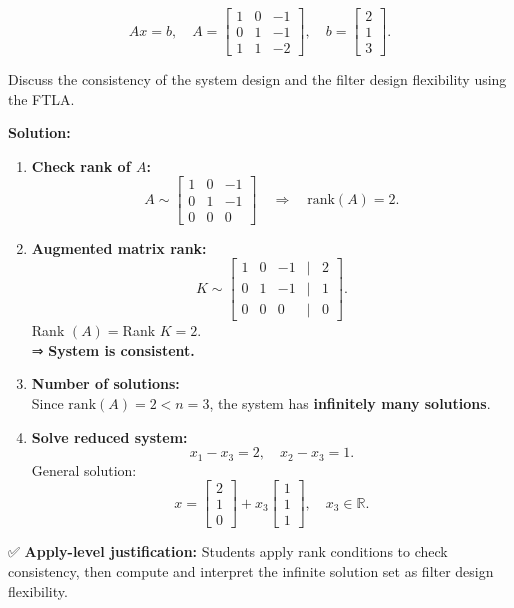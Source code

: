 \documentclass[
  letterpaper,
  DIV=11,
  numbers=noendperiod]{scrreprt}
\begin{document}
\[
Ax = b, \quad 
A = \begin{bmatrix}
1 & 0 & -1 \\
0 & 1 & -1 \\
1 & 1 & -2
\end{bmatrix}, \quad 
b = \begin{bmatrix} 2 \\ 1 \\ 3 \end{bmatrix}.
\]

Discuss the consistency of the system design and the filter design
flexibility using the FTLA.

\textbf{Solution:}

\begin{enumerate}
\def\labelenumi{\arabic{enumi}.}
\item
  \textbf{Check rank of \(A\):} \[
  A \sim 
  \begin{bmatrix}
  1 & 0 & -1 \\
  0 & 1 & -1 \\
  0 & 0 & 0
  \end{bmatrix}
  \quad \Rightarrow \quad \text{rank}(A)=2.
  \]
\item
  \textbf{Augmented matrix rank:} \[
  K \sim 
  \begin{bmatrix}
  1 & 0 & -1 & | & 2 \\
  0 & 1 & -1 & | & 1 \\
  0 & 0 & 0 & | & 0
  \end{bmatrix}.
  \] Rank \((A)=\)Rank \(K=2\).\\
  ⇒ \textbf{System is consistent.}
\item
  \textbf{Number of solutions:}\\
  Since \(\text{rank}(A)=2 < n=3\), the system has \textbf{infinitely
  many solutions}.
\item
  \textbf{Solve reduced system:}\\
  \[
  x_1 - x_3 = 2, \quad x_2 - x_3 = 1.
  \] General solution: \[
  x = \begin{bmatrix} 2 \\ 1 \\ 0 \end{bmatrix} + x_3 \begin{bmatrix} 1 \\ 1 \\ 1 \end{bmatrix}, 
  \quad x_3 \in \mathbb{R}.
  \]
\end{enumerate}

✅ \textbf{Apply-level justification:} Students apply rank conditions to
check consistency, then compute and interpret the infinite solution set
as filter design flexibility.
\end{document}
